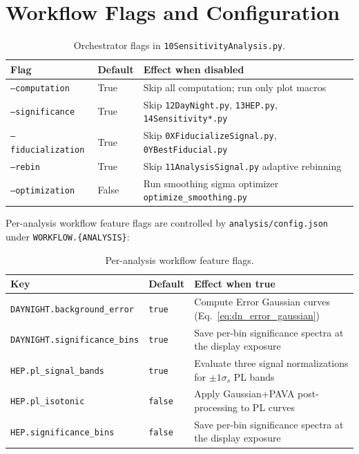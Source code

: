 \documentclass[12pt,a4paper]{article}
\begin{document}
\section{Workflow Flags and Configuration}
\label{sec:flags}

\begin{table}[ht]
\centering
\caption{Orchestrator flags in \texttt{10SensitivityAnalysis.py}.}
\label{tab:flags}
\begin{tabular}{llp{8cm}}
\toprule
Flag & Default & Effect when disabled \\
\midrule
\texttt{--computation}     & True  & Skip all computation; run only plot macros \\
\texttt{--significance}    & True  & Skip \texttt{12DayNight.py}, \texttt{13HEP.py}, \texttt{14Sensitivity*.py} \\
\texttt{--fiducialization} & True  & Skip \texttt{0XFiducializeSignal.py}, \texttt{0YBestFiducial.py} \\
\texttt{--rebin}           & True  & Skip \texttt{11AnalysisSignal.py} adaptive rebinning \\
\texttt{--optimization}    & False & Run smoothing sigma optimizer \texttt{optimize\_smoothing.py} \\
\bottomrule
\end{tabular}
\end{table}

\medskip\noindent
Per-analysis workflow feature flags are controlled by
\texttt{analysis/config.json} under \texttt{WORKFLOW.\{ANALYSIS\}}:

\begin{table}[ht]
\centering
\caption{Per-analysis workflow feature flags.}
\label{tab:analysis_flags}
\begin{tabular}{llp{8cm}}
\toprule
Key & Default & Effect when true \\
\midrule
\texttt{DAYNIGHT.background\_error} & \texttt{true} &
  Compute Error Gaussian curves (Eq.~\ref{eq:dn_error_gaussian}) \\
\texttt{DAYNIGHT.significance\_bins} & \texttt{true} &
  Save per-bin significance spectra at the display exposure \\
\texttt{HEP.pl\_signal\_bands} & \texttt{true} &
  Evaluate three signal normalizations for $\pm1\sigma_s$ PL bands \\
\texttt{HEP.pl\_isotonic} & \texttt{false} &
  Apply Gaussian+PAVA post-processing to PL curves \\
\texttt{HEP.significance\_bins} & \texttt{false} &
  Save per-bin significance spectra at the display exposure \\
\bottomrule
\end{tabular}
\end{table}
\end{document}
